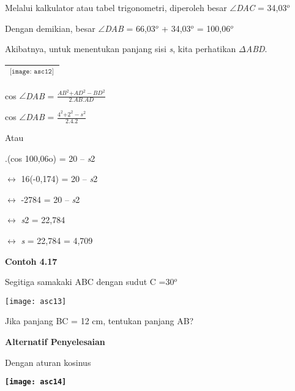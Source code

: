 \documentclass[11pt,fleqn]{book} %
\begin{document}
\begin{myEnumerate}
\begin{itemize}
\noindent 

\noindent \eject 

\noindent Melalui kalkulator atau tabel trigonometri, diperoleh besar $\mathrm{\angle }$\textit{DAC }= 34,03${}^{o}$

\noindent Dengan demikian, besar $\mathrm{\angle }$\textit{DAB }= 66,03${}^{o}$ + 34,03${}^{o}$ = 100,06${}^{o}$

\noindent Akibatnya, untuk menentukan panjang sisi \textit{s}, kita perhatikan $\Delta$\textit{ABD}.

\begin{tabular}{|p{1.6in}|} \hline 
${}^{\texttt{[image: asc12]}}$ \\ \hline 
\end{tabular}

cos $\mathrm{\angle}$\textit{DAB }= $\frac{{AB}^2{+AD}^2-{BD}^2}{2.AB.AD}$

\noindent cos $\mathrm{\angle}$\textit{DAB }= $\frac{4^2{+2}^2-s^2}{2.4.2}$

\noindent 

\noindent Atau

.(cos 100,06o) = 20 -- \textit{s}2

\noindent 

\noindent $\mathrm{\leftrightarrow}$ 16(-0,174) = 20 -- \textit{s}2

\noindent $\mathrm{\leftrightarrow}$ -2784 = 20 -- \textit{s}2

\noindent $\mathrm{\leftrightarrow}$ \textit{s}2 = 22,784

\noindent $\mathrm{\leftrightarrow}$ \textit{s }= 22,784 = 4,709

\noindent 

\noindent \textbf{\eject }

\noindent \textbf{Contoh 4.17}

\noindent Segitiga samakaki ABC dengan sudut C =30${}^{o}$

\noindent \texttt{[image: asc13]}

\noindent Jika panjang BC = 12 cm, tentukan panjang AB?\textbf{}

\noindent \textbf{}

\noindent \textbf{Alternatif Penyelesaian}

\noindent Dengan aturan kosinus 

\noindent \textbf{\texttt{[image: asc14]}  }


\end{itemize}
\end{myEnumerate}
\end{document}
